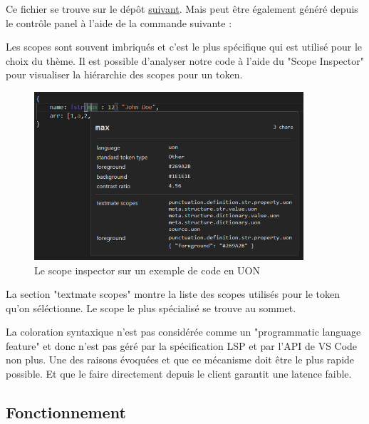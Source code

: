 \documentclass[
    iict, %
    il, %
]{heig-tb}
\begin{document}
Ce fichier se trouve sur le dépôt \href{https://github.com/microsoft/vscode/blob/main/extensions/theme-defaults/themes/dark_vs.json}{suivant}.
Mais peut être également généré depuis le contrôle panel à l'aide de la commande suivante : %


Les scopes sont souvent imbriqués et c'est le plus spécifique qui est utilisé pour le choix du thème.
Il est possible d'analyser notre code à l'aide du "Scope Inspector" pour visualiser la hiérarchie des scopes pour un token.

\begin{figure}[!h]
    \begin{center}
        \includegraphics[width=10cm]{assets/figures/scope-inspector.png}
    \end{center}
    \caption[Scope inspector]{\label{basic-uon} Le scope inspector sur un exemple de code en UON}
\end{figure}

La section "textmate scopes" montre la liste des scopes utilisés pour le token qu'on séléctionne. Le scope le plus spécialisé se trouve au sommet.

La coloration syntaxique n'est pas considérée comme un "programmatic language feature" et donc n'est pas géré par la spécification LSP et par l'API de VS Code non plus.
Une des raisons évoquées et que ce mécanisme doit être le plus rapide possible. Et que le faire directement depuis le client garantit une latence faible.

\subsection{Fonctionnement}
\end{document}
